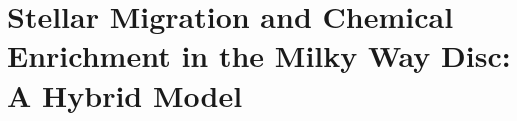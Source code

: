 \documentclass[main.tex]{subfiles}
\begin{document}
\chapter{Stellar Migration and Chemical Enrichment in the Milky Way Disc: A
Hybrid Model}
\label{migration}





\end{document}
